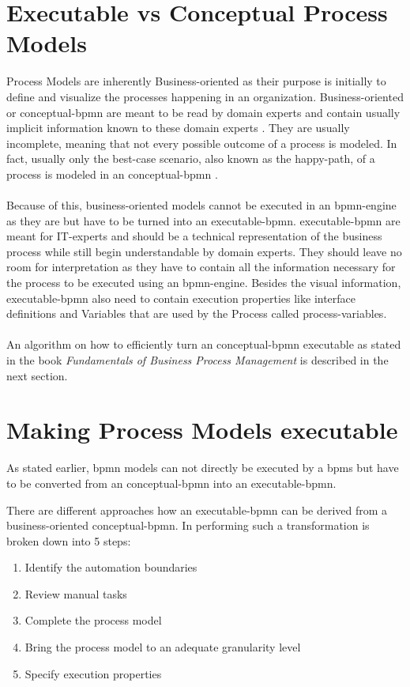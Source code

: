 \section{Executable vs Conceptual Process Models}
Process Models are inherently Business-oriented as their purpose is initially to define and visualize the processes happening in an organization. Business-oriented or  \gls{conceptual-bpmn} are meant to be read by domain experts and contain usually implicit information known to these domain experts \cite{fundamentals}. They are usually incomplete, meaning that not every possible outcome of a process is modeled. In fact, usually only the best-case scenario, also known as the \gls{happy-path}, of a process is modeled in an \gls{conceptual-bpmn} \cite{freund2019real}. \\~\\Because of this, business-oriented models cannot be executed in an \gls{bpmn-engine} as they are but have to be turned into an \gls{executable-bpmn}. \gls{executable-bpmn} are meant for IT-experts and should be a technical representation of the business process while still begin understandable by domain experts. They should leave no room for interpretation as they have to contain all the information necessary for the process to be executed using an \gls{bpmn-engine}. Besides the visual information, \gls{executable-bpmn} also need to contain execution properties like interface definitions and Variables that are used by the Process called \gls{process-variables}.\cite{fundamentals} \\~\\An algorithm on how to efficiently turn an \gls{conceptual-bpmn} executable as stated in the book \textit{Fundamentals of Business Process Management} \cite{fundamentals} is described in the next section. 

\section{Making Process Models executable}
As stated earlier, \gls{bpmn} models can not directly be executed by a \gls{bpms} but have to be converted from an \gls{conceptual-bpmn} into an \gls{executable-bpmn}. 

There are different approaches how an \gls{executable-bpmn} can be derived from a business-oriented \gls{conceptual-bpmn}. In \cite{fundamentals} performing such a transformation is broken down into 5 steps:
\begin{enumerate}
	\item Identify the automation boundaries
	\item Review manual tasks
	\item Complete the process model
	\item Bring the process model to an adequate granularity level
	\item Specify execution properties
\end{enumerate}

